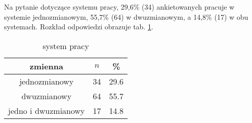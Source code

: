 Na pytanie dotyczące systemu pracy, 29,6\% (34) ankietowanych pracuje w systemie jednozmianowym, 55,7\% (64) w dwuzmianowym, a 14,8\% (17) w obu systemach.  Rozkład odpowiedzi obrazuje tab. \ref{tab:Q4}.

\begin{table}[H]
\caption{system pracy}
\centering
\begin{tabular}{ | c | c | c |}
\hline
zmienna & $n$ & \% \\
\hline
jednozmianowy  &  34  & 29.6 \\
\hline
dwuzmianowy  &  64  & 55.7\\
\hline
jedno i dwuzmianowy  &  17  & 14.8 \\
\hline
\end{tabular}
\label{tab:Q4}
\end{table}


